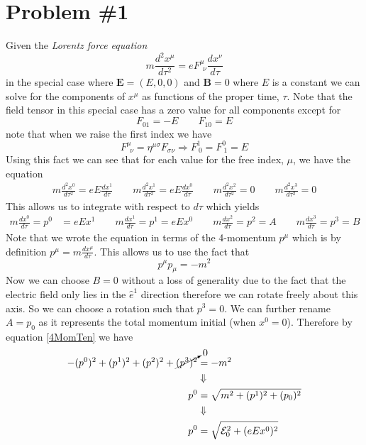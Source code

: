 \documentclass[11pt]{article}
\numberwithin{equation}{section}
\begin{document}


\section{Problem \#1}
    Given the \emph{Lorentz force equation}
    \begin{equation}
        m\frac{d^2x^{\mu}}{d\tau^2} = eF^{\mu}_{\ \ \nu}\frac{dx^{\nu}}{d\tau}
        \label{LorForce}
    \end{equation}
    in the special case where $\mathbf{E} = (E,0,0)$ and $\mathbf{B}=0$ where $E$ is a constant we can solve for the
    components of $x^{\mu}$ as functions of the proper time, $\tau$. Note that the field tensor in this special case
    has a zero value for all components except for 
    $$F_{01} = -E\qquad F_{10} = E$$
    note that when we raise the first index we have
    $$F^{\mu}_{\ \ \nu} = \eta^{\mu\sigma}F_{\sigma\nu}\Rightarrow F^{1}_{\ 0} = F^{0}_{\ 1} = E$$
    Using this fact we can see that for each value for the free index, $\mu$, we have the equation
    \begin{align*}
        m\frac{d^2x^{0}}{d\tau^2} = eE\frac{dx^{1}}{d\tau}\qquad
        m\frac{d^2x^{1}}{d\tau^2} = eE\frac{dx^{0}}{d\tau}\qquad
        m\frac{d^2x^{2}}{d\tau^2} = 0\qquad
        m\frac{d^2x^{3}}{d\tau^2} = 0
    \end{align*} 
    This allows us to integrate with respect to $d\tau$ which yields
    \begin{align*}
        m\frac{dx^{0}}{d\tau} = p^{0} &= eEx^{1}\qquad
        m\frac{dx^{1}}{d\tau} = p^{1} = eEx^{0}\qquad
        m\frac{dx^{2}}{d\tau} = p^{2} = A\qquad
        m\frac{dx^{3}}{d\tau} = p^{3} = B
    \end{align*} 
    Note that we wrote the equation in terms of the 4-momentum $p^{\mu}$ which is by definition
    $p^{\mu} = m\frac{dx^{\mu}}{d\tau}$. This allows us to use the fact that 
    \begin{equation}
        p^{\mu}p_{\mu} = -m^2
        \label{4MomTen}
    \end{equation}
    Now we can choose $B=0$ without a loss of generality due to the fact that the electric field only lies in the 
    $\hat{e}^1$ direction therefore we can rotate freely about this axis. So we can choose a rotation such that 
    $p^3=0$. We can further rename $A=p_0$ as it represents the total momentum initial (when $x^{0}=0$). Therefore
    by equation \ref{4MomTen} we have
    \begin{align*}
        -(p^{0})^2 + (p^{1})^2 + (p^{2})^2 + \cancelto{0}{(p^{3})^2} &= -m^2\\ 
                                                                     &\Downarrow\\
                                                               p^{0} &= \sqrt{m^2 + (p^{1})^2 + (p_0)^2}\\
                                                                     &\Downarrow\\
                                                               p^{0} &= \sqrt{\mathcal{E}_0^2 + (eEx^{0})^2}
    \end{align*}
\end{document}
